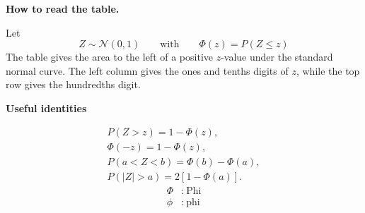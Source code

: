 	\noindent
	\begin{minipage}[t]{0.68\textwidth}
		\vspace{0pt}
		
		\textbf{How to read the table.}
		
		Let
		\[
		Z\sim\mathcal{N}(0,1)
		\qquad \textrm{with} \qquad
		\Phi(z)=P(Z\le z)
		\]
		The table gives the area to the left of a positive \(z\)-value under the
		standard normal curve. The left column gives the ones and tenths digits
		of \(z\), while the top row gives the hundredths digit.
		
		\vspace{2mm}
		\begin{center}
		\end{center}
	\end{minipage}%
	\hfill
	\begin{minipage}[t]{0.28\textwidth}
		\vspace{0pt}
		\centering 
		
		\textbf{Useful identities} \vspace{-8mm}
		
		\begin{gather*}
			P(Z>z)=1-\Phi(z),\\
			\Phi(-z)=1-\Phi(z),\\
			P(a<Z<b)=\Phi(b)-\Phi(a),\\
			P(|Z|>a)=2[1-\Phi(a)].
		\end{gather*}
		\[
		\begin{aligned}
			\Phi &:\ \textrm{Phi} \\
			\phi &:\ \textrm{phi}
		\end{aligned}
		\]
	\end{minipage}
	
